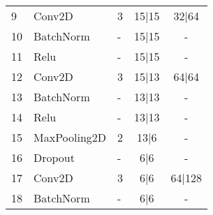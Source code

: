 \documentclass[12pt]{article}
\begin{document}
\begin{table}[H]
\begin{tabular}{lllcc}
9                  & Conv2D               & 3                    & 15|15                                                                       & 32|64                                                                      \\
10                 & BatchNorm            & -                    & 15|15                                                                       & -                                                                          \\
11                 & Relu                 & -                    & 15|15                                                                       & -                                                                          \\
12                 & Conv2D               & 3                    & 15|13                                                                       & 64|64                                                                      \\
13                 & BatchNorm            & -                    & 13|13                                                                       & -                                                                          \\
14                 & Relu                 & -                    & 13|13                                                                       & -                                                                          \\
15                 & MaxPooling2D         & 2                    & 13|6                                                                        & -                                                                          \\
16                 & Dropout              & -                    & 6|6                                                                         & -                                                                          \\
17                 & Conv2D               & 3                    & 6|6                                                                         & 64|128                                                                     \\
18                 & BatchNorm            & -                    & 6|6                                                                         & -                                                                          \\

\end{tabular}
\end{table}
\end{document}
